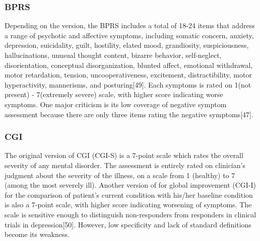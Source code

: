 \documentclass[12pt]{report}
\begin{document}
			\subsubsection{BPRS}
				Depending on the version, the BPRS includes a total of 18-24 items that address a range of psychotic and affective symptoms, including somatic concern, anxiety, depression, suicidality, guilt, hostility, elated mood, grandiosity, suspiciousness, hallucinations, unusual thought content, bizarre behavior, self-neglect, disorientation, conceptual disorganization, blunted affect, emotional withdrawal, motor retardation, tension, uncooperativeness, excitement, distractibility, motor hyperactivity, mannerisms, and posturing[49].  
				Each symptoms is rated on 1(not present) - 7(extremely severe) scale, with higher score indicating worse symptoms. 
				One major criticism is its low coverage of negative symptom assessment because there are only three items rating the negative symptoms[47]. 
				
			\subsubsection{CGI}
				The original version of CGI (CGI-S) is a 7-point scale which rates the overall severity of any mental disorder. 
				The assessment is entirely rated on clinician’s judgment about the severity of the illness, on a scale from 1 (healthy) to 7 (among the most severely ill). 
				Another version of for global improvement (CGI-I) for the comparison of patient’s current condition with his/her baseline condition is also a 7-point scale, with higher score indicating worsening of symptoms. 
				The scale is sensitive enough to distinguish non-responders from responders in clinical trials in depression[50]. 
				However, low specificity and lack of standard definitions become its weakness. 
				
\end{document}

